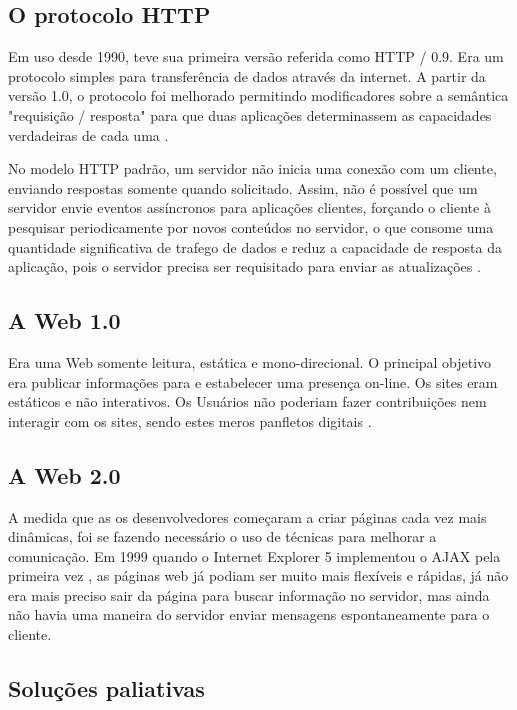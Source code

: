 \subsection{O protocolo HTTP}
Em uso desde 1990, teve sua primeira versão referida como HTTP / 0.9. Era um protocolo simples para transferência de dados através da internet. A partir da versão 1.0, o protocolo foi melhorado permitindo modificadores sobre a semântica "requisição / resposta" para que duas aplicações determinassem as capacidades verdadeiras de cada uma \citep[p.~7]{Fielding1999}.

No modelo HTTP padrão, um servidor não inicia uma conexão com um cliente, enviando respostas somente quando solicitado. Assim, não é possível que um servidor envie eventos assíncronos para aplicações clientes, forçando o cliente à pesquisar periodicamente por novos conteúdos no servidor, o que consome uma quantidade significativa de trafego de dados e reduz a capacidade de resposta da aplicação, pois o servidor precisa ser requisitado para enviar as atualizações \citep{Loreto2011}.

\subsection{A Web 1.0}
Era uma Web somente leitura, estática e mono-direcional. O principal objetivo era publicar informações para e estabelecer uma presença on-line. Os sites eram estáticos e não interativos. Os Usuários não poderiam fazer contribuições nem interagir com os sites, sendo estes meros panfletos digitais \citep[p.~2-3]{Aghaei2012}.

\subsection{A Web 2.0}
A medida que as os desenvolvedores começaram a criar páginas cada vez mais dinâmicas, foi se fazendo necessário o uso de técnicas para melhorar a comunicação. Em 1999 quando o Internet Explorer 5 implementou o AJAX pela primeira vez \citep{Asleson2006}, as páginas web já podiam ser muito mais flexíveis e rápidas, já não era mais preciso sair da página para buscar informação no servidor, mas ainda não havia uma maneira do servidor enviar mensagens espontaneamente para o cliente.

\subsection{Soluções paliativas}

